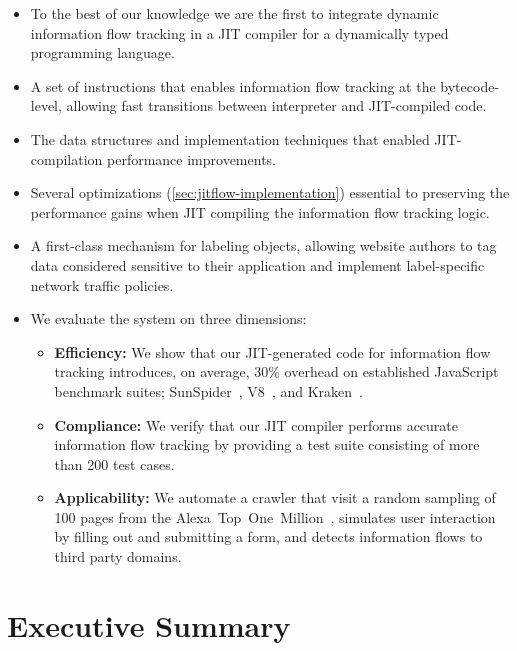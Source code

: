 \begin{itemize}

\item{To the best of our knowledge we are the first to integrate dynamic information flow tracking in a JIT compiler for a dynamically typed programming language.}

\item{A set of instructions that enables information flow tracking at the bytecode-level, allowing fast transitions between interpreter and JIT-compiled code.}

\item{The data structures and implementation techniques that enabled JIT-compilation performance improvements.}

\item Several optimizations (\autoref{sec:jitflow-implementation}) essential to preserving the performance gains when JIT compiling the information flow tracking logic.

\item{A first-class mechanism for labeling objects, allowing website authors to tag data considered sensitive to their application and implement label-specific network traffic policies.}

\item{We evaluate the system on three dimensions:}

\begin{itemize}
\item{\textbf{Efficiency:}
We show that our JIT-generated code for information flow tracking introduces, on average, 30\% overhead on established JavaScript benchmark suites;  SunSpider~\cite{sunspider}, V8~\cite{v8}, and Kraken~\cite{kraken}.
}

\item{\textbf{Compliance:}
We verify that our JIT compiler performs accurate information flow tracking by providing a test suite consisting of more than 200 test cases.
}

\item{\textbf{Applicability:}
We automate a crawler that visit a random sampling of 100 pages from the Alexa~Top~One~Million~\cite{alexa}, simulates user interaction by filling out and submitting a form, and detects information flows to third party domains.
}
\end{itemize}

\end{itemize}

\section{Executive Summary}

